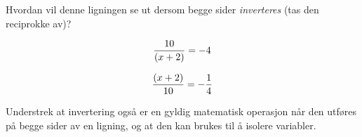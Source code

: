 

Hvordan vil denne ligningen se ut dersom begge sider {\it inverteres} (tas den reciprokke av)?

$${10 \over (x + 2)} = -4$$







$${(x + 2) \over 10} = -{1 \over 4}$$







Understrek at invertering også er en gyldig matematisk operasjon når den utføres på begge sider av en ligning, og at den kan brukes til å isolere variabler.



